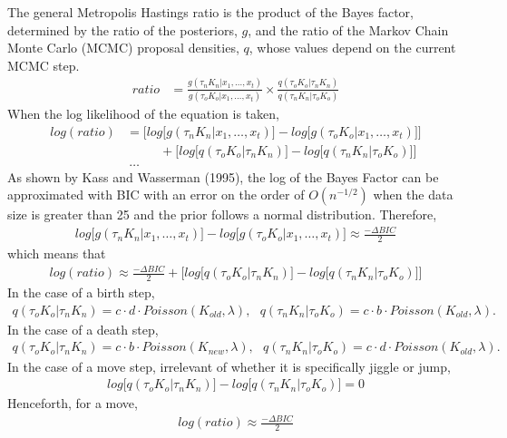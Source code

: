\documentclass[submit]{smj}
\begin{document}
The general Metropolis Hastings ratio is the product of the Bayes factor, determined by the ratio of the posteriors, $g$, and the ratio of the Markov Chain Monte Carlo (MCMC) proposal densities, $q$, whose values depend on the current MCMC step. 
\begin{align*}
ratio &= \frac{g(\tau_{n} K_{n} | x_1,\dots,x_t) }{g(\tau_{o} K_{o} | x_1,\dots,x_t)} \times \frac{q(\tau_{o} K_{o} | \tau_{n} K_{n})}{q(\tau_{n} K_{n}| \tau_{o} K_{o})}
\end{align*}
When the log likelihood of the equation is taken, 
\begin{align*}
log(ratio) & =\Big[ log \big[ g(\tau_{n} K_{n} | x_1,\dots,x_t)
\big] - log \big[ g(\tau_{o} K_{o} | x_1,\dots,x_t)\big] \Big] \\
& \ \ \ \ \ \ \ \ \ \ \ \ + 
\Big[ log \big[ q(\tau_{o} K_{o} | \tau_{n} K_{n}) \big] - log \big[ q(\tau_{n} K_{n}| \tau_{o} K_{o})  \big] \Big] \\
& \ …
\end{align*}
As shown by Kass and Wasserman (1995), the log of the Bayes Factor can be approximated with BIC with an error on the order of $O(n^{-1/2})$ when the data size is greater than 25 and the prior follows a normal distribution.
Therefore, 
\begin{align*}
 log \big[ g(\tau_{n} K_{n} | x_1,\dots,x_t)
\big] - log \big[ g(\tau_{o} K_{o} | x_1,\dots,x_t)\big]  \approx \frac{- \Delta BIC}{2} 
\end{align*}
which means that 
\begin{align*}
log(ratio) \approx \frac{- \Delta BIC}{2} + 
\Big[ log \big[ q(\tau_{o} K_{o} | \tau_{n} K_{n}) \big] - log \big[ q(\tau_{n} K_{n}| \tau_{o} K_{o})  \big] \Big]
\end{align*}
In the case of a birth step, 
\begin{align*} 
q(\tau_{o} K_{o} | \tau_{n} K_{n}) = c \cdot d \cdot Poisson(K_{old} , \lambda), \ \ \ q(\tau_{n} K_{n} | \tau_{o} K_{o}) = c \cdot b \cdot Poisson(K_{old} , \lambda).
\end{align*}
In the case of a death step,  
\begin{align*}
q(\tau_{o} K_{o} | \tau_{n} K_{n}) = c \cdot b \cdot Poisson(K_{new} , \lambda) , \ \ \ q(\tau_{n} K_{n} | \tau_{o} K_{o}) = c \cdot d \cdot Poisson(K_{old} , \lambda).
\end{align*} 
In the case of a move step, irrelevant of whether it is specifically jiggle or jump, 
\begin{align*} 
log \big[ q(\tau_{o} K_{o} | \tau_{n} K_{n}) \big] - log \big[ q(\tau_{n} K_{n}| \tau_{o} K_{o})  \big] = 0 
\end{align*}
Henceforth, for a move, 
\begin{align*}
log(ratio) \approx \frac{- \Delta BIC}{2} 
\end{align*}
\end{document}
